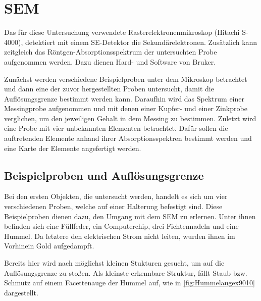 \section{SEM}

	Das für diese Untersuchung verwendete Rasterelektronenmikroskop (Hitachi S-4000), detektiert mit einem SE-Detektor die Sekundärelektronen.
	Zusätzlich kann zeitgleich das Röntgen-Absorptionsspektrum der untersuchten Probe aufgenommen werden.
	Dazu dienen Hard- und Software von Bruker\cite{bruker}.

	Zunächst werden verschiedene Beispielproben unter dem Mikroskop betrachtet und dann eine der zuvor hergestellten Proben untersucht, damit die Auflösungsgrenze bestimmt werden kann.
	Daraufhin wird das Spektrum einer Messingprobe aufgenommen und mit denen einer Kupfer- und einer Zinkprobe verglichen, um den jeweiligen Gehalt in dem Messing zu bestimmen.
	Zuletzt wird eine Probe mit vier unbekannten Elementen betrachtet.
	Dafür sollen die auftretenden Elemente anhand ihrer Absorptionsspektren bestimmt werden und eine Karte der Elemente angefertigt werden.

\subsection{Beispielproben und Auflösungsgrenze} %

	Bei den ersten Objekten, die untersucht werden, handelt es sich um vier verschiedenen Proben, welche auf einer Halterung befestigt sind.
	Diese Beispielproben dienen dazu, den Umgang mit dem SEM zu erlernen.
	Unter ihnen befinden sich eine Füllfeder, ein Computerchip, drei Fichtennadeln und eine Hummel.
	Da letztere den elektrischen Strom nicht leiten, wurden ihnen im Vorhinein Gold aufgedampft.

	Bereits hier wird nach möglichst kleinen Stukturen gesucht, um auf die Auflösungsgrenze zu stoßen.
	Als kleinste erkennbare Struktur, fällt Staub bzw. Schmutz auf einem Facettenauge der Hummel auf, wie in \cref{fig:Hummelaugex9010} dargestellt.

